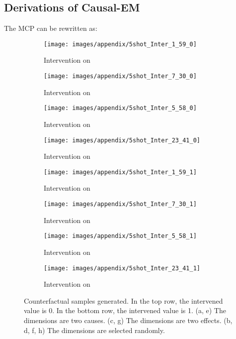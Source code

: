 \documentclass[letterpaper]{article} \usepackage{aaai23}  \usepackage{times}  \usepackage{helvet}  \usepackage{courier}  \usepackage[hyphens]{url}  \usepackage{graphicx} \urlstyle{rm} \def\UrlFont{\rm}  \usepackage{natbib}  \usepackage{caption} \frenchspacing  \setlength{\pdfpagewidth}{8.5in}  \setlength{\pdfpageheight}{11in}  \usepackage{algorithm}
\theoremstyle{plain}
\theoremstyle{definition}
\theoremstyle{remark}
\begin{document}
\subsection{Derivations of Causal-EM} \label{app:em}
The MCP can be rewritten as:
\begin{small}
	
\end{small}
\begin{figure*}
	\centering
	\begin{subfigure}[t]{.22\textwidth}
		\centering
		\texttt{[image: images/appendix/5shot\_Inter\_1\_59\_0]}
		\caption{Intervention on }
		\label{fig:app_res_a}
	\end{subfigure}
	\hfill
	\begin{subfigure}[t]{.22\textwidth}
		\centering
		\texttt{[image: images/appendix/5shot\_Inter\_7\_30\_0]}
		\caption{Intervention on }
		\label{fig:app_res_b}
	\end{subfigure}		
	\hfill		
	\begin{subfigure}[t]{.22 \textwidth}
		\centering
		\texttt{[image: images/appendix/5shot\_Inter\_5\_58\_0]}
		\caption{Intervention on }
		\label{fig:app_res_c}
	\end{subfigure}
	\hfill
	\begin{subfigure}[t]{.22\textwidth}
		\centering
		\texttt{[image: images/appendix/5shot\_Inter\_23\_41\_0]}
		\caption{Intervention on }
		\label{fig:app_res_d}
	\end{subfigure}
	\medskip
	\centering
	\begin{subfigure}[t]{.22\textwidth}
		\centering
		\texttt{[image: images/appendix/5shot\_Inter\_1\_59\_1]}
		\caption{Intervention on }
		\label{fig:app_res_e}
	\end{subfigure}
	\hfill
	\begin{subfigure}[t]{.22\textwidth}
		\centering
		\texttt{[image: images/appendix/5shot\_Inter\_7\_30\_1]}
		\caption{Intervention on }
		\label{fig:app_res_f}
	\end{subfigure}		
	\hfill		
	\begin{subfigure}[t]{.22 \textwidth}
		\centering
		\texttt{[image: images/appendix/5shot\_Inter\_5\_58\_1]}
		\caption{Intervention on }
		\label{fig:app_res_g}
	\end{subfigure}
	\hfill
	\begin{subfigure}[t]{.22\textwidth}
		\centering
		\texttt{[image: images/appendix/5shot\_Inter\_23\_41\_1]}
		\caption{Intervention on }
		\label{fig:app_res_h}
	\end{subfigure}
	
	\caption{Counterfactual samples generated. In the top row, the intervened value is 0. In the bottom row, the intervened value is 1. (a, e) The dimensions are two causes.  (c, g) The dimensions are two effects. (b, d, f, h) The dimensions are selected randomly.}  
	\label{fig:app_counter_all}
\end{figure*}
\end{document}
